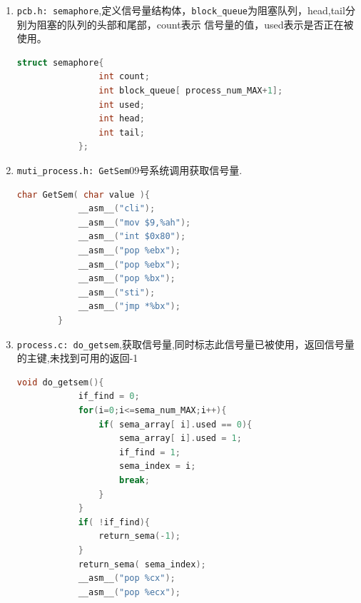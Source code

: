 \documentclass[a4paper]{article}
\begin{document}
{\begin{enumerate}
{\begin{lstlisting}[language={C}]
wRootDirSizeForLoop	    dw	RootDirSectors	; 根目录区剩余扇区数
; 初始化为14，在循环中会递减至零
wSectorNo				dw	0           ; 当前扇区号，初始化为0，在循环中会递增
bOdd					db	0			; 奇数还是偶数FAT项
filename                dw  0           ; 文件名指针
baseAddress             dw  0           ; 文件加载段地址
offsetAddress           dw  0           ; 文件加载偏移地址

BPB_BytsPerSec			dw 512          ; 每扇区字节数
BPB_SecPerTrk	        dw 18	        ; 每磁道扇区数
BS_DrvNum		        db 0	        ; 中断 13 的驱动器号（软盘
\end{lstlisting}}
=======
	\item \verb|pcb.h: semaphore|,定义信号量结构体，\verb|block_queue|为阻塞队列，head,tail分别为阻塞的队列的头部和尾部，count表示
	信号量的值，used表示是否正在被使用。
		{\scriptsize\begin{lstlisting}[language={C}]
			struct semaphore{
				int count;
				int block_queue[ process_num_MAX+1];
				int used;
				int head;
				int tail;
			};
 		\end{lstlisting}}
	\item \verb|muti_process.h: GetSem|09号系统调用获取信号量.
		{\scriptsize\begin{lstlisting}[language={C}]
		char GetSem( char value ){
			__asm__("cli");
			__asm__("mov $9,%ah");
			__asm__("int $0x80");
			__asm__("pop %ebx");
			__asm__("pop %ebx");
			__asm__("pop %bx");
			__asm__("sti");
			__asm__("jmp *%bx");
		}
 		\end{lstlisting}}
	\item \verb|process.c: do_getsem|,获取信号量,同时标志此信号量已被使用，返回信号量的主键,未找到可用的返回-1
		{\scriptsize\begin{lstlisting}[language={C}]
		void do_getsem(){
			if_find = 0;
			for(i=0;i<=sema_num_MAX;i++){
				if( sema_array[ i].used == 0){
					sema_array[ i].used = 1;
					if_find = 1;
					sema_index = i;
					break;
				}
			}
			if( !if_find){
				return_sema(-1);
			}
			return_sema( sema_index);
			__asm__("pop %cx");
			__asm__("pop %ecx");


\end{lstlisting}}
\end{enumerate}}
\end{document}

